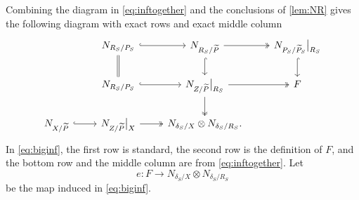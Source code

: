 \documentclass[11 pt]{amsart}
\providecommand {\from}{{\colon}}
\numberwithin{equation}{section}
\begin{document}
Combining the diagram in \eqref{eq:inftogether} and the conclusions of \autoref{lem:NR} gives the following diagram with exact rows and exact middle column
\begin{equation}\label{eq:biginf}
  \begin{tikzcd}
    & N_{R_S/P_S} \arrow[hookrightarrow]{r}\arrow[equal]{d}& N_{R_S/\widetilde{P}} \arrow[two heads]{r}\arrow[hookrightarrow]{d}& N_{P_S/\widetilde{P}_S}\big|_{R_S}\arrow[hookrightarrow]{d}\\
    &N_{R_S/P_S} \arrow[hookrightarrow]{r}& N_{Z/\widetilde{P}}\big|_{R_S} \arrow[two heads]{r}  \arrow[two heads]{d}  & F \\
    N_{X/\widetilde{P}} \arrow[hookrightarrow]{r}& N_{Z/\widetilde{P}}\big|_X \arrow[two heads]{r}& N_{\delta_S/X} \otimes N_{\delta_S/R_S}.
  \end{tikzcd}
\end{equation}
In \eqref{eq:biginf}, the first row is standard, the second row is the definition of $F$, and the bottom row and the middle column are from \eqref{eq:inftogether}.
Let
\begin{equation}\label{eq:defe}
  e \from F  \to N_{\delta_S/X} \otimes N_{\delta_S/R_S}
\end{equation}
be the map induced in \eqref{eq:biginf}.
\end{document}

